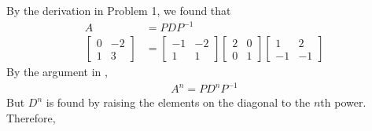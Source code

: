 \documentclass[10pt,letterpaper,final]{report}
\begin{document}
By the derivation in Problem 1, we found that
\begin{align*}
  A                 & = PDP^{-1}                               \\[1ex]
  \begin{bmatrix}
    0 & -2 \\
    1 & 3
  \end{bmatrix} & = \begin{bmatrix}
                      -1 & -2 \\
                      1  & 1
                    \end{bmatrix}\begin{bmatrix}
                                   2 & 0 \\
                                   0 & 1
                                 \end{bmatrix}\begin{bmatrix}
                                                1  & 2  \\
                                                -1 & -1
                                              \end{bmatrix}
\end{align*}
By the argument in \textcite[Example~2, p.~290]{LayEtAl2020LinearAlgebraAndItsApplications},
\begin{align*}
  A^n = PD^nP^{-1}
\end{align*}
But $D^n$ is found by raising the elements on the diagonal to the $n$th power. Therefore,
\end{document}
